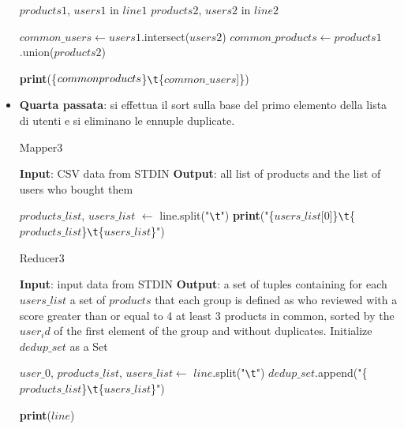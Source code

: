 \begin{itemize}
\begin{algorithm}[!ht]
\begin{algorithmic}[1]
        \STATE $products1$, $users1$ in $line1$
        \STATE $products2$, $users2$ in $line2$

        \STATE $common\_users \gets users1$.intersect($users2$) 
        \STATE $common\_products \gets products1$.union($products2$)

        \STATE \textbf{print}(\{$common\-products$\}\texttt{\textbackslash t}\{$common\_users$]\})
        \ENDIF
      \ENDFOR
    \end{algorithmic}
    \end{algorithm}
    
    \newpage
    \item \textbf{Quarta passata}: si effettua il sort sulla base del primo elemento della lista di utenti e si eliminano le ennuple duplicate.

          \begin{algorithm}[!ht]
    \caption{Mapper3}
      \begin{algorithmic}[1]
        \STATE \textbf{Input}: CSV data from STDIN
        \STATE \textbf{Output}: all list of products and the list of users who bought them
        
        \STATE $products\_list$, $users\_list$ $\gets$ line.split("\texttt{\textbackslash t}")
        \STATE \textbf{print}("\{$users\_list$[0]\}\texttt{\textbackslash t}\{$products\_list$\}\texttt{\textbackslash t}\{$users\_list$\}")
        
       \ENDFOR
      \end{algorithmic}
    \end{algorithm}
    
    \begin{algorithm}[!ht]
      \caption{Reducer3}
      \begin{algorithmic}[1]
      \STATE \textbf{Input}: input data from STDIN
      \STATE \textbf{Output}: a set of tuples containing for each $users\_list$ a set of $products$ that each group is defined as who reviewed with a score greater than or equal to 4 at least 3 products in common, sorted by the $user_id$ of the first element of the group and without duplicates.
      \STATE Initialize $dedup\_set$ as a Set

        \STATE $user\_0$, $products\_list$, $users\_list \gets$ $line$.split("\texttt{\textbackslash t}")
        \STATE $dedup\_set$.append("\{$products\_list$\}\texttt{\textbackslash t}\{$users\_list$\}")
      \ENDFOR
      
        \STATE \textbf{print}($line$)
      \ENDFOR
    \end{algorithmic}
    \end{algorithm}    
  \end{itemize}


